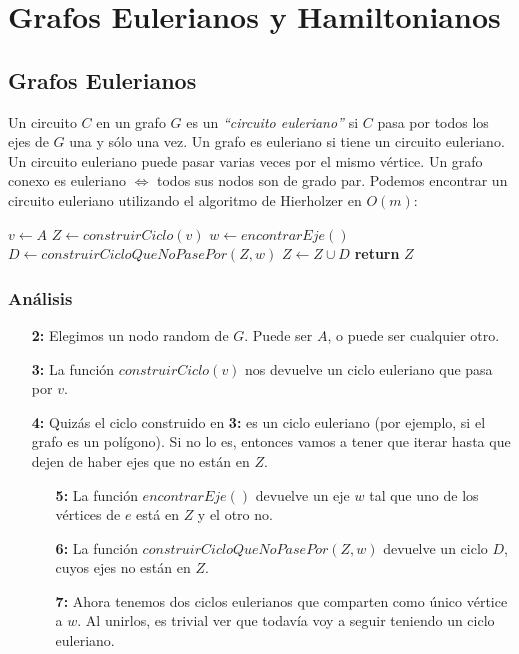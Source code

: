 \newpage
\section{Grafos Eulerianos y Hamiltonianos}

\subsection{Grafos Eulerianos}

Un circuito $C$ en un grafo $G$ es un \emph{``circuito euleriano''} si $C$ pasa por todos los ejes de $G$ una y s\'olo una vez. Un grafo es euleriano si tiene un circuito euleriano. Un circuito euleriano puede pasar varias veces por el mismo v\'ertice. Un grafo conexo es euleriano $\Leftrightarrow$ todos sus nodos son de grado par. Podemos encontrar un circuito euleriano utilizando el algoritmo de Hierholzer en $O(m)$: 

\begin{algorithm}
\begin{algorithmic}[1]
  \State $v \gets A$
  \State $Z \gets construirCiclo(v)$
    \State $w \gets encontrarEje()$
    \State $D \gets construirCicloQueNoPasePor(Z, w)$
    \State $Z \gets Z \cup D$
  \EndWhile
  \State \textbf{return} $Z$
\EndFunction
\end{algorithmic}
\end{algorithm}

\subsubsection*{An\'alisis}

\begin{enumerate}
  \item [\textbf{2:}] Elegimos un nodo random de $G$. Puede ser $A$, o puede ser cualquier otro.
  \item [\textbf{3:}] La funci\'on $construirCiclo(v)$ nos devuelve un ciclo euleriano que pasa por $v$.
  \item [\textbf{4:}] Quiz\'as el ciclo construido en \textbf{3:} es un ciclo euleriano (por ejemplo, si el grafo es un pol\'igono). Si no lo es, entonces vamos a tener que iterar hasta que dejen de haber ejes que no est\'an en $Z$.
  \begin{enumerate}
    \item [\textbf{5:}] La funci\'on $encontrarEje()$ devuelve un eje $w$ tal que uno de los v\'ertices de $e$ est\'a en $Z$ y el otro no.
    \item [\textbf{6:}] La funci\'on $construirCicloQueNoPasePor(Z, w)$ devuelve un ciclo $D$, cuyos ejes no est\'an en $Z$.
    \item [\textbf{7:}] Ahora tenemos dos ciclos eulerianos que comparten como \'unico v\'ertice a $w$. Al unirlos, es trivial ver que todav\'ia voy a seguir teniendo un ciclo euleriano.
  \end{enumerate}
\end{enumerate}

